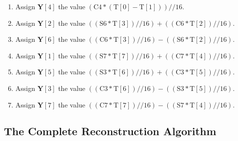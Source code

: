 \documentclass[9pt,letterpaper]{book}
\newcommand{\bitvar}[1]{\ensuremath{\mathbf{\bm{#1}}}}
\newcommand{\locvar}[1]{\ensuremath{\mathrm{#1}}}
\numberwithin{equation}{chapter}
\numberwithin{figure}{chapter}
\numberwithin{table}{chapter}
\begin{document}
\begin{enumerate}
\item
Assign $\bitvar{Y}[4]$ the value
 $(\locvar{C4}*(\locvar{T}[0]-\locvar{T}[1]))//16$.
\item
Assign $\bitvar{Y}[2]$ the value
 $((\locvar{S6}*\locvar{T}[3])//16)+
 ((\locvar{C6}*\locvar{T}[2])//16)$.
\item
Assign $\bitvar{Y}[6]$ the value
 $((\locvar{C6}*\locvar{T}[3])//16)-
 ((\locvar{S6}*\locvar{T}[2])//16)$.
\item
Assign $\bitvar{Y}[1]$ the value
 $((\locvar{S7}*\locvar{T}[7])//16)+
 ((\locvar{C7}*\locvar{T}[4])//16)$.
\item
Assign $\bitvar{Y}[5]$ the value
 $((\locvar{S3}*\locvar{T}[6])//16)+
 ((\locvar{C3}*\locvar{T}[5])//16)$.
\item
Assign $\bitvar{Y}[3]$ the value
 $((\locvar{C3}*\locvar{T}[6])//16)-
 ((\locvar{S3}*\locvar{T}[5])//16)$.
\item
Assign $\bitvar{Y}[7]$ the value
 $((\locvar{C7}*\locvar{T}[7])//16)-
 ((\locvar{S7}*\locvar{T}[4])//16)$.
\end{enumerate}

\subsection{The Complete Reconstruction Algorithm}
\label{sub:recon}
\end{document}
